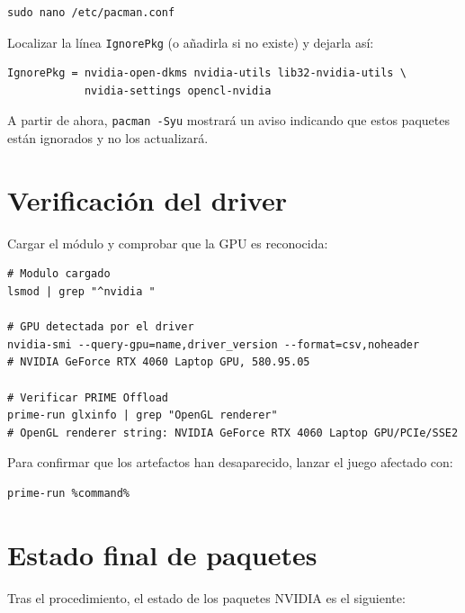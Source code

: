 \documentclass[12pt,a4paper]{article}
\begin{document}
\begin{lstlisting}[style=bash]
sudo nano /etc/pacman.conf
\end{lstlisting}

Localizar la línea \texttt{IgnorePkg} (o añadirla si no existe) y dejarla
así:

\begin{lstlisting}[style=bash]
IgnorePkg = nvidia-open-dkms nvidia-utils lib32-nvidia-utils \
            nvidia-settings opencl-nvidia
\end{lstlisting}

A partir de ahora, \texttt{pacman -Syu} mostrará un aviso indicando que
estos paquetes están ignorados y no los actualizará.

\section{Verificación del driver}

Cargar el módulo y comprobar que la GPU es reconocida:

\begin{lstlisting}[style=bash]
# Modulo cargado
lsmod | grep "^nvidia "

# GPU detectada por el driver
nvidia-smi --query-gpu=name,driver_version --format=csv,noheader
# NVIDIA GeForce RTX 4060 Laptop GPU, 580.95.05

# Verificar PRIME Offload
prime-run glxinfo | grep "OpenGL renderer"
# OpenGL renderer string: NVIDIA GeForce RTX 4060 Laptop GPU/PCIe/SSE2
\end{lstlisting}

Para confirmar que los artefactos han desaparecido, lanzar el juego
afectado con:

\begin{lstlisting}[style=bash]
prime-run %command%
\end{lstlisting}

\section{Estado final de paquetes}

Tras el procedimiento, el estado de los paquetes NVIDIA es el siguiente:
\end{document}

